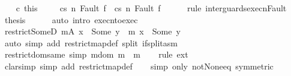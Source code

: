 \begin{isabellebody}
\ \ \isamarkupfalse%
\ c\ this\ \isanewline
\ \ \isamarkupfalse%
\ {\isachardoublequoteopen}{\isasymGamma}{\isasymturnstile}{\isasymlangle}c{}{\isacharcomma}s{\isasymrangle}\ {\isacharequal}n{\isasymRightarrow}\ Fault\ f\ {\isasymor}\ {\isasymGamma}{\isasymturnstile}{\isasymlangle}c{}{\isacharcomma}s{\isasymrangle}\ {\isacharequal}n{\isasymRightarrow}\ Fault\ f{\isachardoublequoteclose}\isanewline
\ \ \ \ \isamarkupfalse%
\ {\isacharparenleft}rule\ inter{\isacharunderscore}guards{\isacharunderscore}execn{\isacharunderscore}Fault{\isacharparenright}\isanewline
\ \ \isamarkupfalse%
\ {\isacharquery}thesis\isanewline
\ \ \ \ \isamarkupfalse%
\ {\isacharparenleft}auto\ intro{\isacharcolon}\ execn{\isacharunderscore}to{\isacharunderscore}exec{\isacharparenright}\isanewline
{}\isamarkupfalse%
%
\endisatagproof
{\isafoldproof}%
%
\isadelimproof
%
\endisadelimproof
%
\isamarkuptrue%
\isamarkupfalse%
\ restrict{\isacharunderscore}SomeD{\isacharcolon}\ {\isachardoublequoteopen}{\isacharparenleft}m{\isacharbar}\isactrlbsub A\isactrlesub {\isacharparenright}\ x\ {\isacharequal}\ Some\ y\ {\isasymLongrightarrow}\ m\ x\ {\isacharequal}\ Some\ y{\isachardoublequoteclose}\isanewline
%
\isadelimproof
\ \ %
\endisadelimproof
%
\isatagproof
{}\isamarkupfalse%
\ {\isacharparenleft}auto\ simp\ add{\isacharcolon}\ restrict{\isacharunderscore}map{\isacharunderscore}def\ split{\isacharcolon}\ if{\isacharunderscore}split{\isacharunderscore}asm{\isacharparenright}%
\endisatagproof
{\isafoldproof}%
%
\isadelimproof
\isanewline
%
\endisadelimproof
\isanewline
\isanewline
{}\isamarkupfalse%
\ restrict{\isacharunderscore}dom{\isacharunderscore}same\ {\isacharbrackleft}simp{\isacharbrackright}{\isacharcolon}\ {\isachardoublequoteopen}m{\isacharbar}\isactrlbsub dom\ m\isactrlesub \ {\isacharequal}\ m{\isachardoublequoteclose}\isanewline
%
\isadelimproof
\ \ %
\endisadelimproof
%
\isatagproof
{}\isamarkupfalse%
\ {\isacharparenleft}rule\ ext{\isacharparenright}\isanewline
\ \ \isamarkupfalse%
\ {\isacharparenleft}clarsimp\ simp\ add{\isacharcolon}\ restrict{\isacharunderscore}map{\isacharunderscore}def{\isacharparenright}\isanewline
\ \ \isamarkupfalse%
\ {\isacharparenleft}simp\ only{\isacharcolon}\ not{\isacharunderscore}None{\isacharunderscore}eq\ {\isacharbrackleft}symmetric{\isacharbrackright}{\isacharparenright}\isanewline

\end{isabellebody}

